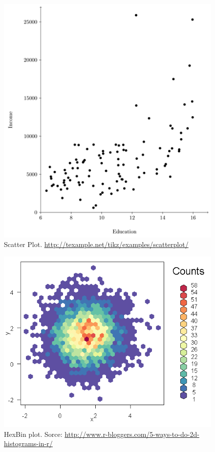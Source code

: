 \begin{figure}[h]
\centering
\includegraphics[height=0.3\textheight]{art/scatterplot}
\caption[Scatter Plot]{Scatter Plot. \newline 
\url{http://texample.net/tikz/examples/scatterplot/}}
\label{fig:scatterplot}
\end{figure}





\begin{figure}[h]
\centering
\includegraphics[height=0.3\textheight]{art/hexbin2}
\caption[HexBin Plot]{HexBin plot. Sorce: \url{http://www.r-bloggers.com/5-ways-to-do-2d-histograms-in-r/}}
\label{fig:hexbin}
\end{figure}






